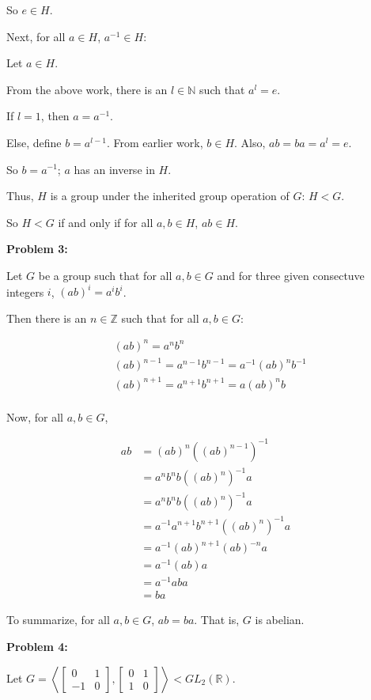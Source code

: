 \documentclass[a4paper,12pt]{article}
\newcommand{\tab}{\hspace{4mm}} %
\newcommand{\shunt}{\vspace{20mm}}
\newcommand{\N}{\mathbb{N}}
\newcommand{\R}{\mathbb{R}}
\newcommand{\Z}{\mathbb{Z}}
\begin{document}
\tab \tab So $e \in H$.

\tab Next, for all $a \in H$, $a^{-1} \in H$:

\tab \tab Let $a \in H$.

\tab \tab From the above work, there is an $l \in \N$ such that $a^l = e$.

\tab \tab If $l =1$, then $a = a^{-1}$.

\tab \tab Else, define $b = a^{l-1}$. From earlier work, $b \in H$. Also, $ab = ba = a^l = e$.

\tab \tab So $b = a^{-1}$; $a$ has an inverse in $H$.

\tab Thus, $H$ is a group under the inherited group operation of $G$: $H<G$.

So $H<G$ if and only if for all $a, b \in H$, $ab \in H$.

\shunt

{\bf Problem 3:}

Let $G$ be a group such that for all $a,b \in G$ and for three given consectuve integers $i$, $(ab)^i = a^ib^i$.

Then there is an $n \in \Z$ such that for all $a, b \in G$:

\begin{align*}
&(ab)^n = a^nb^n \\
&(ab)^{n-1} = a^{n-1}b^{n-1} = a^{-1}(ab)^n b^{-1} \\
&(ab)^{n+1} = a^{n+1}b^{n+1} = a(ab)^nb \\
\end{align*}

Now, for all $a, b \in G$,

\begin{align*}
ab &= (ab)^n {((ab)^{n-1})}^{-1} \\
&=a^nb^n b ((ab)^{n})^{-1}a \\
&=a^nb^n b ((ab)^{n})^{-1}a \\
&=a^{-1}a^{n+1}b^{n+1}((ab)^{n})^{-1}a \\
&=a^{-1}(ab)^{n+1}(ab)^{-n}a \\
&=a^{-1}(ab)a \\
&=a^{-1}aba \\
&=ba
\end{align*}

To summarize, for all $a, b \in G$, $ab= ba$. That is, $G$ is abelian.

\shunt

{\bf Problem 4:}

Let $G = \left\langle\left[\begin{smallmatrix}0&1\\ -1&0 \end{smallmatrix}\right],\left[\begin{smallmatrix}0&1\\ 1&0 \end{smallmatrix}\right] \right\rangle < GL_2(\R)$.
\end{document}
